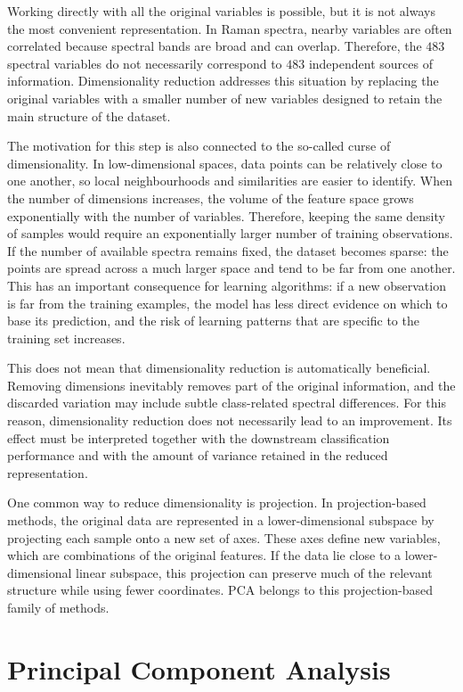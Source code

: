 Working directly with all the original variables is possible, but it is not always the
most convenient representation. In Raman spectra, nearby variables are often correlated because spectral bands are broad and can overlap. Therefore, the \(483\) spectral variables do not necessarily correspond
to \(483\) independent sources of information. Dimensionality reduction addresses this
situation by replacing the original variables with a smaller number of new variables
designed to retain the main structure of the dataset.

The motivation for this step is also connected to the so-called curse of dimensionality.
In low-dimensional spaces, data points can be relatively close to one another, so local
neighbourhoods and similarities are easier to identify. When the number of dimensions
increases, the volume of the feature space grows exponentially with the number of
variables. Therefore, keeping the same density of samples would require an exponentially
larger number of training observations. If the number of available spectra remains fixed,
the dataset becomes sparse: the points are spread across a much larger space and tend to
be far from one another. This has an important consequence for learning algorithms: if a
new observation is far from the training examples, the model has less direct evidence on
which to base its prediction, and the risk of learning patterns that are specific to the
training set increases. 

This does not mean that dimensionality reduction is automatically beneficial. Removing
dimensions inevitably removes part of the original information, and the discarded
variation may include subtle class-related spectral differences. For this reason, dimensionality reduction does not necessarily lead to an improvement. Its effect must be interpreted together with the downstream
classification performance and with the amount of variance retained in the reduced
representation.

One common way to reduce dimensionality is projection. In projection-based methods, the
original data are represented in a lower-dimensional subspace by projecting each sample
onto a new set of axes. These axes define new variables, which are combinations of the
original features. If the data lie close to a lower-dimensional linear subspace, this
projection can preserve much of the relevant structure while using fewer coordinates. PCA
belongs to this projection-based family of methods.

\section{Principal Component Analysis}
\label{sec:pca_theory}

